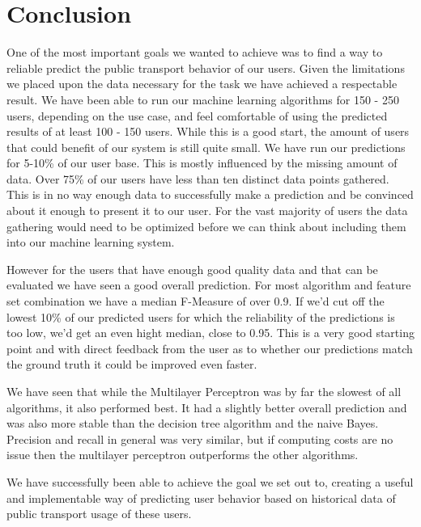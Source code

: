 \newpage
\section{Conclusion}

One of the most important goals we wanted to achieve was to find a way to reliable predict the public transport behavior of our users. Given the limitations we placed upon the data necessary for the task we have achieved a respectable result. We have been able to run our machine learning algorithms for 150 - 250 users, depending on the use case, and feel comfortable of using the predicted results of at least 100 - 150 users. While this is a good start, the amount of users that could benefit of our system is still quite small. We have run our predictions for 5-10\% of our user base. This is mostly influenced by the missing amount of data. Over 75\% of our users have less than ten distinct data points gathered. This is in no way enough data to successfully make a prediction and be convinced about it enough to present it to our user. For the vast majority of users the data gathering would need to be optimized before we can think about including them into our machine learning system.

However for the users that have enough good quality data and that can be evaluated we have seen a good overall prediction. For most algorithm and feature set combination we have a median F-Measure of over 0.9. If we'd cut off the lowest 10\% of our predicted users for which the reliability of the predictions is too low, we'd get an even hight median, close to 0.95. This is a very good starting point and with direct feedback from the user as to whether our predictions match the ground truth it could be improved even faster.

We have seen that while the Multilayer Perceptron was by far the slowest of all algorithms, it also performed best. It had a slightly better overall prediction and was also more stable than the decision tree algorithm and the naive Bayes. Precision and recall in general was very similar, but if computing costs are no issue then the multilayer perceptron outperforms the other algorithms.

We have successfully been able to achieve the goal we set out to, creating a useful and implementable way of predicting user behavior based on historical data of public transport usage of these users.